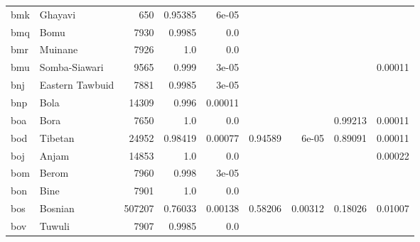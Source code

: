 \documentclass[11pt]{article}
\begin{document}
\begin{table*}[ht]
{\begin{tabular}{llrrrrrrr}
bmk         & Ghayavi         & 650         & 0.95385         & 6e-05         &          &          &          &          \\

bmq         & Bomu         & 7930         & 0.9985         & 0.0         &          &          &          &          \\

bmr         & Muinane         & 7926         & 1.0         & 0.0         &          &          &          &          \\

bmu         & Somba-Siawari         & 9565         & 0.999         & 3e-05         &          &          &          & 0.00011         \\

bnj         & Eastern Tawbuid         & 7881         & 0.9985         & 3e-05         &          &          &          &          \\

bnp         & Bola         & 14309         & 0.996         & 0.00011         &          &          &          &          \\

boa         & Bora         & 7650         & 1.0         & 0.0         &          &          & 0.99213         & 0.00011         \\

bod         & Tibetan         & 24952         & 0.98419         & 0.00077         & 0.94589         & 6e-05         & 0.89091         & 0.00011         \\

boj         & Anjam         & 14853         & 1.0         & 0.0         &          &          &          & 0.00022         \\

bom         & Berom         & 7960         & 0.998         & 3e-05         &          &          &          &          \\

bon         & Bine         & 7901         & 1.0         & 0.0         &          &          &          &          \\

bos         & Bosnian         & 507207         & 0.76033         & 0.00138         & 0.58206         & 0.00312         & 0.18026         & 0.01007         \\

bov         & Tuwuli         & 7907         & 0.9985         & 0.0         &          &          &          &          \\


\end{tabular}}
\end{table*}
\end{document}
